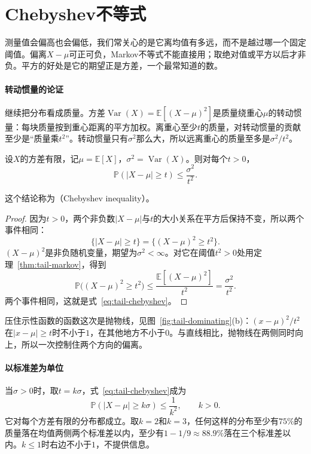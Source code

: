 \section{Chebyshev不等式}
\label{sec:tail-chebyshev}

测量值会偏高也会偏低，我们常关心的是它离均值有多远，而不是越过哪一个固定阈值。偏离$X-\mu$可正可负，Markov不等式不能直接用；取绝对值或平方以后才非负。平方的好处是它的期望正是方差，一个最常知道的数。

\paragraph{转动惯量的论证}
继续把分布看成质量。方差$\operatorname{Var}(X)=\mathbb{E}[(X-\mu)^2]$是质量绕重心$\mu$的转动惯量：每块质量按到重心距离的平方加权。离重心至少$t$的质量，对转动惯量的贡献至少是“质量乘$t^2$”。转动惯量只有$\sigma^2$那么大，所以远离重心的质量至多是$\sigma^2/t^2$。

\begin{theorem}[Chebyshev不等式]
\label{thm:tail-chebyshev}
设$X$的方差有限，记$\mu=\mathbb{E}[X]$，$\sigma^2=\operatorname{Var}(X)$。则对每个$t>0$，
\begin{equation}
 \mathbb{P}(\lvert X-\mu\rvert\geq t)\leq\frac{\sigma^2}{t^2} .
 \label{eq:tail-chebyshev}
\end{equation}
\end{theorem}

这个结论称为（Chebyshev inequality）。

\begin{proof}
因为$t>0$，两个非负数$\lvert X-\mu\rvert$与$t$的大小关系在平方后保持不变，所以两个事件相同：
\[
 \{\lvert X-\mu\rvert\geq t\}=\{(X-\mu)^2\geq t^2\} .
\]
$(X-\mu)^2$是非负随机变量，期望为$\sigma^2<\infty$。对它在阈值$t^2>0$处用定理~\ref{thm:tail-markov}，得到
\[
 \mathbb{P}\bigl((X-\mu)^2\geq t^2\bigr)\leq\frac{\mathbb{E}[(X-\mu)^2]}{t^2}=\frac{\sigma^2}{t^2} .
\]
两个事件相同，这就是式~\eqref{eq:tail-chebyshev}。
\end{proof}

压住示性函数的函数这次是抛物线，见图~\ref{fig:tail-dominating}(b)：$(x-\mu)^2/t^2$在$\lvert x-\mu\rvert\geq t$时不小于$1$，在其他地方不小于$0$。与直线相比，抛物线在两侧同时向上，所以一次控制住两个方向的偏离。

\paragraph{以标准差为单位}
当$\sigma>0$时，取$t=k\sigma$，式~\eqref{eq:tail-chebyshev}成为
\begin{equation}
 \mathbb{P}(\lvert X-\mu\rvert\geq k\sigma)\leq\frac{1}{k^2},\qquad k>0 .
 \label{eq:tail-chebyshev-k}
\end{equation}
它对每个方差有限的分布都成立。取$k=2$和$k=3$，任何这样的分布至少有$75\%$的质量落在均值两侧两个标准差以内，至少有$1-1/9\approx88.9\%$落在三个标准差以内。$k\leq1$时右边不小于$1$，不提供信息。


